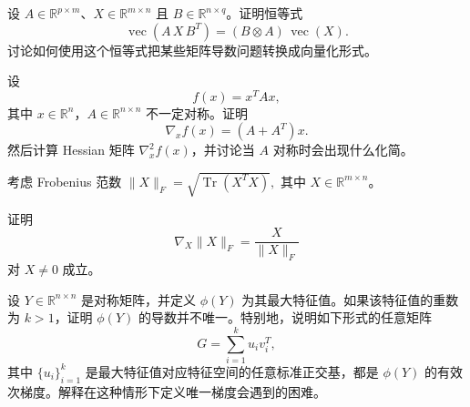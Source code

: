 \begin{exercise}
   设 $A\in\mathbb{R}^{p\times m}$、$X\in\mathbb{R}^{m\times n}$ 且 $B\in\mathbb{R}^{n\times q}$。证明恒等式
   \[
      \operatorname{vec}(A\,X\,B^T) = (B \otimes A)\,\operatorname{vec}(X).
   \]
   讨论如何使用这个恒等式把某些矩阵导数问题转换成向量化形式。
\end{exercise}
\begin{exercise}
   设
   \[
      f(x) = x^T A x,
   \]
   其中 $x\in\mathbb{R}^n$，$A\in\mathbb{R}^{n\times n}$ 不一定对称。证明
   \[
      \nabla_x f(x) = (A + A^T)x.
   \]
   然后计算 Hessian 矩阵 $\nabla^2_x f(x)$，并讨论当 $A$ 对称时会出现什么化简。
\end{exercise}
\begin{exercise}
   考虑 Frobenius 范数
   \(
      \|X\|_F = \sqrt{\operatorname{Tr}(X^T X)},
   \)
   其中 $X\in\mathbb{R}^{m\times n}$。

   证明
   \[
      \nabla_X \|X\|_F = \frac{X}{\|X\|_F}
   \]
   对 $X\neq 0$ 成立。
\end{exercise}
\begin{exercise}
   设 $Y\in\mathbb{R}^{n\times n}$ 是对称矩阵，并定义 $\phi(Y)$ 为其最大特征值。如果该特征值的重数为 $k>1$，证明 $\phi(Y)$ 的导数并不唯一。特别地，说明如下形式的任意矩阵
   \[
      G = \sum_{i=1}^k u_i v_i^T,
   \]
   其中 $\{u_i\}_{i=1}^k$ 是最大特征值对应特征空间的任意标准正交基，都是 $\phi(Y)$ 的有效次梯度。解释在这种情形下定义唯一梯度会遇到的困难。
\end{exercise}
